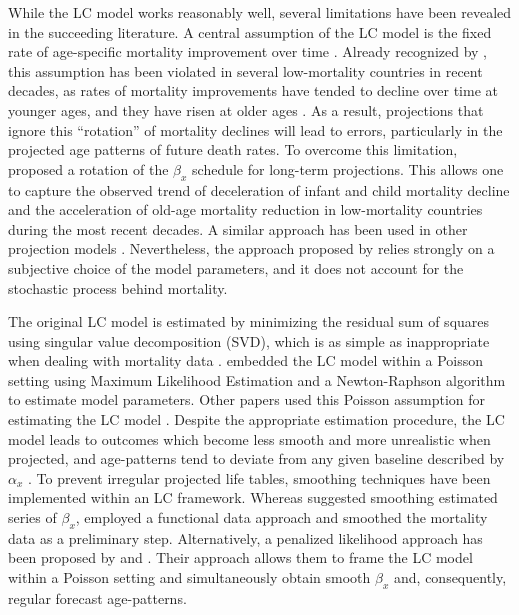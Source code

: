 \documentclass[Thesis]{subfiles}
\begin{document}
While the LC model works reasonably well, several limitations have been revealed in the succeeding literature. A central assumption of the LC model is the fixed rate of age-specific mortality improvement over time \citep{lee2001evaluating}. Already recognized by \citet{alho1992comment}, this assumption has been violated in several low-mortality countries in recent decades, as rates of mortality improvements have tended to decline over time at younger ages, and they have risen at older ages \citep{kannisto1994reductions, vaupel1998biodemographic, wilmoth1999rectangularization}. As a result, projections that ignore this ``rotation'' of mortality declines will lead to errors, particularly in the projected age patterns of future death rates. To overcome this limitation, \cite{li2013extending} proposed a rotation of the $\beta_x$ schedule for long-term projections. This allows one to capture the observed trend of deceleration of infant and child mortality decline and the acceleration of old-age mortality reduction in low-mortality countries during the most recent decades. A similar approach has been used in other projection models \citep{sevcikova2016agespecific}. Nevertheless, the approach proposed by \cite{li2013extending} relies strongly on a subjective choice of the model parameters, and it does not account for the stochastic process behind mortality.

The original LC model is estimated by minimizing the residual sum of squares using singular value decomposition (SVD), which is as simple as inappropriate when dealing with mortality data \citep{wilmoth1993computational, dejong2006extending, koissi2006fuzzy}. \cite{brouhns2002poisson} embedded the LC model within a Poisson setting using Maximum Likelihood Estimation and a Newton-Raphson algorithm to estimate model parameters. Other papers used this Poisson assumption for estimating the LC model \citep{renshaw2003leecarterAPPSTAT, brouhns2005bootstrapping, czado2005bayesian, haberman2008mortality, li2017optimizing}. Despite the appropriate estimation procedure, the LC model leads to outcomes which become less smooth and more unrealistic when projected, and age-patterns tend to deviate from any given baseline described by $\alpha_{x}$ \citep{girosi2007understanding, girosi2008demographic}. To prevent irregular projected life tables, smoothing techniques have been implemented within an LC framework. Whereas \cite{renshaw2003forecasting} suggested smoothing estimated series of $\beta_{x}$, \cite{hyndman2007robust} employed a functional data approach and smoothed the mortality data as a preliminary step. Alternatively, a penalized likelihood approach has been proposed by \cite{delwarde2007smoothing} and \cite{currie2013smoothing}. Their approach allows them to frame the LC model within a Poisson setting and simultaneously obtain smooth $\beta_{x}$ and, consequently, regular forecast age-patterns. 
\end{document}
